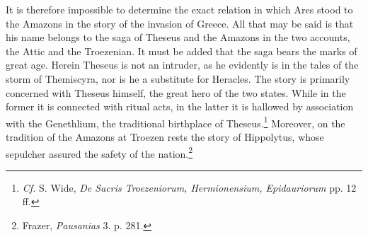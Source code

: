 \documentclass[a4paper, 12pt, oneside]{article}
\begin{document}
It is therefore impossible to determine the exact relation in which Ares stood to the Amazons in the story of the invasion of Greece. All that may be said is that his name belongs to the saga of Theseus and the Amazons in the two accounts, the Attic and the Troezenian. It must be added that the saga bears the marks of great age. Herein Theseus is not an intruder, as he evidently is in the tales of the storm of Themiscyra, nor is he a substitute for Heracles. The story is primarily concerned with Theseus himself, the great hero of the two states. While in the former it is connected with ritual acts, in the latter it is hallowed by association with the Genethlium, the traditional birthplace of Theseus.\footnote{\emph{Cf.} S. Wide, \emph{De Sacris Troezeniorum, Hermionensium, Epidauriorum} pp. 12 ff.} Moreover, on the tradition of the Amazons at Troezen rests the story of Hippolytus, whose sepulcher assured the safety of the nation.\footnote{Frazer, \emph{Pausanias} 3. p. 281.}
\end{document}
